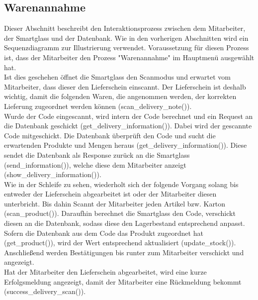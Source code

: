 \subsection{Warenannahme}
Dieser Abschnitt beschreibt den Interaktionsprozess zwischen dem Mitarbeiter, der Smartglass und der Datenbank. Wie in den vorherigen Abschnitten wird ein Sequenzdiagramm zur Illustrierung verwendet. Voraussetzung für diesen Prozess ist, dass der Mitarbeiter den Prozess "Warenannahme" im Hauptmenü ausgewählt hat. 
\\
Ist dies geschehen öffnet die Smartglass den Scanmodus und erwartet vom Mitarbeiter, dass dieser den Lieferschein einscannt. Der Lieferschein ist deshalb wichtig, damit die folgenden Waren, die angenommen werden, der korrekten Lieferung zugeordnet werden können (scan\_delivery\_note()). 
\\
Wurde der Code eingescannt, wird intern der Code berechnet und ein Request an die Datenbank geschickt (get\_delivery\_information()). Dabei wird der gescannte Code mitgeschickt. Die Datenbank überprüft den Code und sucht die erwartenden Produkte und Mengen heraus (get\_delivery\_information()). Diese sendet die Datenbank als Response zurück an die Smartglass (send\_information()), welche diese dem Mitarbeiter anzeigt (show\_delivery\_information()).
\\
Wie in der Schleife zu sehen, wiederholt sich der folgende Vorgang solang bis entweder der Lieferschein abgearbeitet ist oder der Mitarbeiter diesen unterbricht. Bis dahin Scannt der Mitarbeiter jeden Artikel bzw. Karton (scan\_product()). Daraufhin berechnet die Smartglass den Code, verschickt diesen an die Datenbank, sodass diese den Lagerbestand entsprechend anpasst. Sofern die Datenbank aus dem Code das Produkt zugeordnet hat (get\_product()), wird der Wert entsprechend aktualisiert (update\_stock()). Anschließend werden Bestätigungen bis runter zum Mitarbeiter verschickt und angezeigt.
\\
Hat der Mitarbeiter den Lieferschein abgearbeitet, wird eine kurze Erfolgsmeldung angezeigt, damit der Mitarbeiter eine Rückmeldung bekommt (success\_delivery\_scan()).

